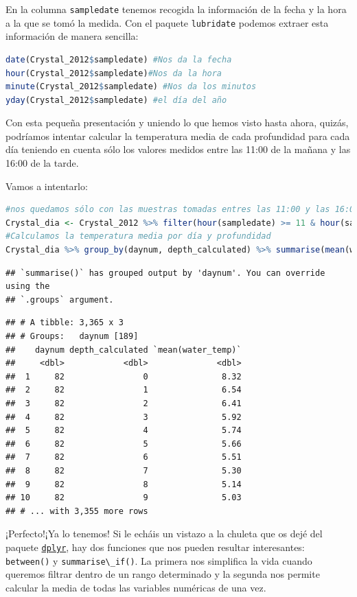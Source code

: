 \documentclass[
]{book}
\newcommand{\passthrough}[1]{#1}
\begin{document}
En la columna \passthrough{\lstinline!sampledate!} tenemos recogida la información de la fecha y la hora a la que se tomó la medida. Con el paquete \passthrough{\lstinline!lubridate!} podemos extraer esta información de manera sencilla:

\begin{lstlisting}[language=R]
date(Crystal_2012$sampledate) #Nos da la fecha
hour(Crystal_2012$sampledate)#Nos da la hora
minute(Crystal_2012$sampledate) #Nos da los minutos
yday(Crystal_2012$sampledate) #el día del año
\end{lstlisting}

Con esta pequeña presentación y uniendo lo que hemos visto hasta ahora, quizás, podríamos intentar calcular la temperatura media de cada profundidad para cada día teniendo en cuenta sólo los valores medidos entre las 11:00 de la mañana y las 16:00 de la tarde.

Vamos a intentarlo:

\begin{lstlisting}[language=R]
#nos quedamos sólo con las muestras tomadas entres las 11:00 y las 16:00
Crystal_dia <- Crystal_2012 %>% filter(hour(sampledate) >= 11 & hour(sampledate) <= 16)
#Calculamos la temperatura media por día y profundidad
Crystal_dia %>% group_by(daynum, depth_calculated) %>% summarise(mean(water_temp))
\end{lstlisting}

\begin{lstlisting}
## `summarise()` has grouped output by 'daynum'. You can override using the
## `.groups` argument.
\end{lstlisting}

\begin{lstlisting}
## # A tibble: 3,365 x 3
## # Groups:   daynum [189]
##    daynum depth_calculated `mean(water_temp)`
##     <dbl>            <dbl>              <dbl>
##  1     82                0               8.32
##  2     82                1               6.54
##  3     82                2               6.41
##  4     82                3               5.92
##  5     82                4               5.74
##  6     82                5               5.66
##  7     82                6               5.51
##  8     82                7               5.30
##  9     82                8               5.14
## 10     82                9               5.03
## # ... with 3,355 more rows
\end{lstlisting}

¡Perfecto!¡Ya lo tenemos! Si le echáis un vistazo a la chuleta que os dejé del paquete \href{https://raw.githubusercontent.com/rstudio/cheatsheets/master/data-transformation.pdf}{\passthrough{\lstinline!dplyr!}}, hay dos funciones que nos pueden resultar interesantes: \passthrough{\lstinline!between()!} y \passthrough{\lstinline!summarise\_if()!}. La primera nos simplifica la vida cuando queremos filtrar dentro de un rango determinado y la segunda nos permite calcular la media de todas las variables numéricas de una vez.
\end{document}

